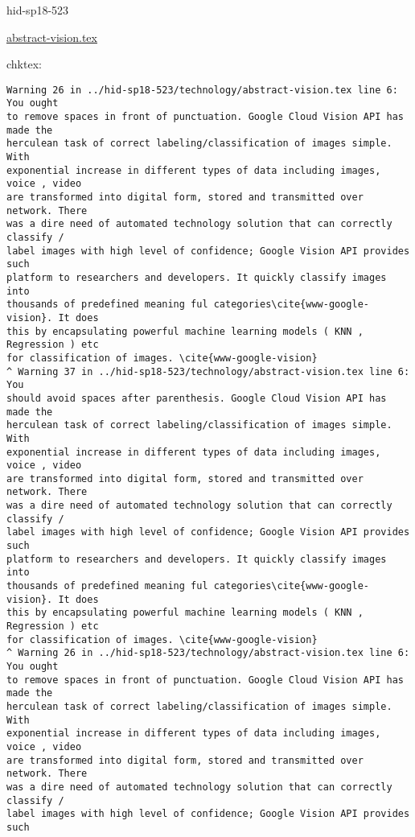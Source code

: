 \begin{IU}

hid-sp18-523

\href{https://github.com/cloudmesh-community/hid-sp18-523/blob/master//technology/abstract-vision.tex}{abstract-vision.tex}

 
chktex:
\begin{tiny}
\begin{verbatim}
Warning 26 in ../hid-sp18-523/technology/abstract-vision.tex line 6: You ought
to remove spaces in front of punctuation. Google Cloud Vision API has made the
herculean task of correct labeling/classification of images simple. With
exponential increase in different types of data including images, voice , video
are transformed into digital form, stored and transmitted over network. There
was a dire need of automated technology solution that can correctly classify /
label images with high level of confidence; Google Vision API provides such
platform to researchers and developers. It quickly classify images into
thousands of predefined meaning ful categories\cite{www-google-vision}. It does
this by encapsulating powerful machine learning models ( KNN , Regression ) etc
for classification of images. \cite{www-google-vision}
^ Warning 37 in ../hid-sp18-523/technology/abstract-vision.tex line 6: You
should avoid spaces after parenthesis. Google Cloud Vision API has made the
herculean task of correct labeling/classification of images simple. With
exponential increase in different types of data including images, voice , video
are transformed into digital form, stored and transmitted over network. There
was a dire need of automated technology solution that can correctly classify /
label images with high level of confidence; Google Vision API provides such
platform to researchers and developers. It quickly classify images into
thousands of predefined meaning ful categories\cite{www-google-vision}. It does
this by encapsulating powerful machine learning models ( KNN , Regression ) etc
for classification of images. \cite{www-google-vision}
^ Warning 26 in ../hid-sp18-523/technology/abstract-vision.tex line 6: You ought
to remove spaces in front of punctuation. Google Cloud Vision API has made the
herculean task of correct labeling/classification of images simple. With
exponential increase in different types of data including images, voice , video
are transformed into digital form, stored and transmitted over network. There
was a dire need of automated technology solution that can correctly classify /
label images with high level of confidence; Google Vision API provides such

\end{verbatim}
\end{tiny}
\end{IU}
